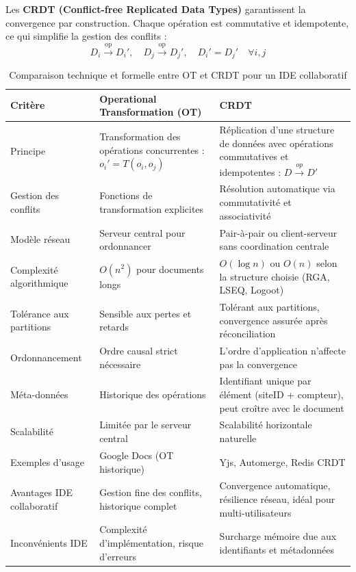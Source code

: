 \documentclass[a4paper,oneside,12pt]{book}
\renewcommand\arraystretch{1.5}
\begin{document}
Les \textbf{CRDT (Conflict-free Replicated Data Types)} garantissent la convergence par construction. Chaque opération est commutative et idempotente, ce qui simplifie la gestion des conflits :
\[
D_i \xrightarrow{\text{op}} D_i' , \quad D_j \xrightarrow{\text{op}} D_j' , \quad D_i' = D_j' \quad \forall i,j
\]

\begin{table}[H]
	\centering
	\renewcommand{\arraystretch}{1.5}
	\begin{tabular}{|p{4cm}|p{5.5cm}|p{5.5cm}|}
		\hline
		\textbf{Critère} & \textbf{Operational Transformation (OT)} & \textbf{CRDT} \\
		\hline
		Principe & Transformation des opérations concurrentes : $o_i' = T(o_i, o_j)$ & Réplication d’une structure de données avec opérations commutatives et idempotentes : $D \xrightarrow{op} D'$ \\
		\hline
		Gestion des conflits & Fonctions de transformation explicites & Résolution automatique via commutativité et associativité \\
		\hline
		Modèle réseau & Serveur central pour ordonnancer & Pair-à-pair ou client-serveur sans coordination centrale \\
		\hline
		Complexité algorithmique & $O(n^2)$ pour documents longs & $O(\log n)$ ou $O(n)$ selon la structure choisie (RGA, LSEQ, Logoot) \\
		\hline
		Tolérance aux partitions & Sensible aux pertes et retards & Tolérant aux partitions, convergence assurée après réconciliation \\
		\hline
		Ordonnancement & Ordre causal strict nécessaire & L’ordre d’application n’affecte pas la convergence \\
		\hline
		Méta-données & Historique des opérations & Identifiant unique par élément (siteID + compteur), peut croître avec le document \\
		\hline
		Scalabilité & Limitée par le serveur central & Scalabilité horizontale naturelle \\
		\hline
		Exemples d’usage & Google Docs (OT historique) & Yjs, Automerge, Redis CRDT \\
		\hline
		Avantages IDE collaboratif & Gestion fine des conflits, historique complet & Convergence automatique, résilience réseau, idéal pour multi-utilisateurs \\
		\hline
		Inconvénients IDE & Complexité d’implémentation, risque d’erreurs & Surcharge mémoire due aux identifiants et métadonnées \\
		\hline
	\end{tabular}
	\caption{Comparaison technique et formelle entre OT et CRDT pour un IDE collaboratif}
\end{table}
\end{document}
